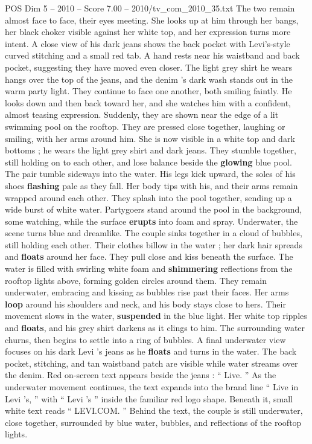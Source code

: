 \begin{textsample}{POS Dim 5 – 2010 – Score 7.00 – 2010/tv\_com\_2010\_35.txt}
The two remain almost face to face, their eyes meeting.
She looks up at him through her bangs, her black choker visible against her white top, and her expression turns more intent.
A close view of his dark jeans shows the back pocket with Levi’s-style curved stitching and a small red tab.
A hand rests near his waistband and back pocket, suggesting they have moved even closer.
The light grey shirt he wears hangs over the top of the jeans, and the denim ’s dark wash stands out in the warm party light.
They continue to face one another, both smiling faintly.
He looks down and then back toward her, and she watches him with a confident, almost teasing expression.
Suddenly, they are shown near the edge of a lit swimming pool on the rooftop.
They are pressed close together, laughing or smiling, with her arms around him.
She is now visible in a white top and dark bottoms ; he wears the light grey shirt and dark jeans.
They stumble together, still holding on to each other, and lose balance beside the \textbf{glowing} blue pool.
The pair tumble sideways into the water.
His legs kick upward, the soles of his shoes \textbf{flashing} pale as they fall.
Her body tips with his, and their arms remain wrapped around each other.
They splash into the pool together, sending up a wide burst of white water.
Partygoers stand around the pool in the background, some watching, while the surface \textbf{erupts} into foam and spray.
Underwater, the scene turns blue and dreamlike.
The couple sinks together in a cloud of bubbles, still holding each other.
Their clothes billow in the water ; her dark hair spreads and \textbf{floats} around her face.
They pull close and kiss beneath the surface.
The water is filled with swirling white foam and \textbf{shimmering} reflections from the rooftop lights above, forming golden circles around them.
They remain underwater, embracing and kissing as bubbles rise past their faces.
Her arms \textbf{loop} around his shoulders and neck, and his body stays close to hers.
Their movement slows in the water, \textbf{suspended} in the blue light.
Her white top ripples and \textbf{floats}, and his grey shirt darkens as it clings to him.
The surrounding water churns, then begins to settle into a ring of bubbles.
A final underwater view focuses on his dark Levi ’s jeans as he \textbf{floats} and turns in the water.
The back pocket, stitching, and tan waistband patch are visible while water streams over the denim.
Red on-screen text appears beside the jeans : “ Live. ” As the underwater movement continues, the text expands into the brand line “ Live in Levi ’s, ” with “ Levi ’s ” inside the familiar red logo shape.
Beneath it, small white text reads “ LEVI.COM. ” Behind the text, the couple is still underwater, close together, surrounded by blue water, bubbles, and reflections of the rooftop lights.

\end{textsample}
